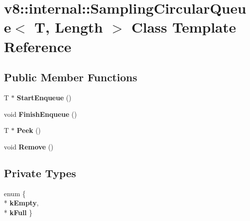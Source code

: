\hypertarget{classv8_1_1internal_1_1_sampling_circular_queue}{}\section{v8\+:\+:internal\+:\+:Sampling\+Circular\+Queue$<$ T, Length $>$ Class Template Reference}
\label{classv8_1_1internal_1_1_sampling_circular_queue}
\subsection*{Public Member Functions}
\begin{DoxyCompactItemize}
\item 
T $\ast$ {\bfseries Start\+Enqueue} ()\hypertarget{classv8_1_1internal_1_1_sampling_circular_queue_a464bbb1c0a62161897d417f2b6117dbf}{}\label{classv8_1_1internal_1_1_sampling_circular_queue_a464bbb1c0a62161897d417f2b6117dbf}

\item 
void {\bfseries Finish\+Enqueue} ()\hypertarget{classv8_1_1internal_1_1_sampling_circular_queue_a80ba4d959f9f8d1fe8af4ce9c4dfa066}{}\label{classv8_1_1internal_1_1_sampling_circular_queue_a80ba4d959f9f8d1fe8af4ce9c4dfa066}

\item 
T $\ast$ {\bfseries Peek} ()\hypertarget{classv8_1_1internal_1_1_sampling_circular_queue_a5259fbc4b5d578eecb0ef3a2566890f2}{}\label{classv8_1_1internal_1_1_sampling_circular_queue_a5259fbc4b5d578eecb0ef3a2566890f2}

\item 
void {\bfseries Remove} ()\hypertarget{classv8_1_1internal_1_1_sampling_circular_queue_ad12288f6816d0390fd9ec26bca49852a}{}\label{classv8_1_1internal_1_1_sampling_circular_queue_ad12288f6816d0390fd9ec26bca49852a}

\end{DoxyCompactItemize}
\subsection*{Private Types}
\begin{DoxyCompactItemize}
\item 
enum \{ \\*
{\bfseries k\+Empty}, 
\\*
{\bfseries k\+Full}
 \}\hypertarget{classv8_1_1internal_1_1_sampling_circular_queue_ac2d9f8ad82302d93ad027115ca9c11c8}{}\label{classv8_1_1internal_1_1_sampling_circular_queue_ac2d9f8ad82302d93ad027115ca9c11c8}

\end{DoxyCompactItemize}

